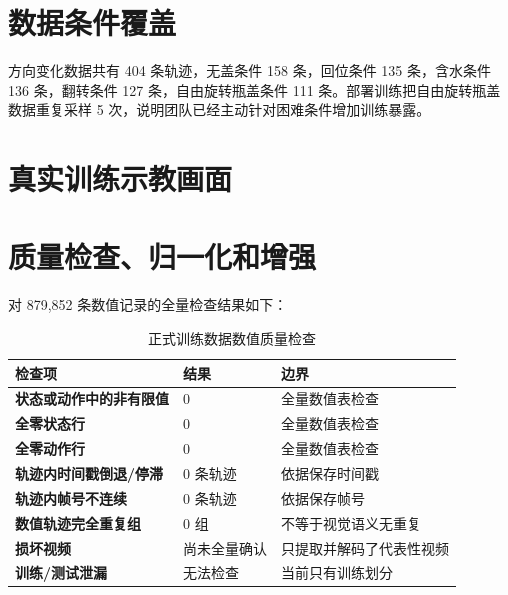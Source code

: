 \section{数据条件覆盖}


方向变化数据共有 404 条轨迹，无盖条件 158 条，回位条件 135 条，含水条件 136 条，翻转条件 127 条，自由旋转瓶盖条件 111 条。部署训练把自由旋转瓶盖数据重复采样 5 次，说明团队已经主动针对困难条件增加训练暴露。


\section{真实训练示教画面}


\section{质量检查、归一化和增强}

对 879,852 条数值记录的全量检查结果如下：

\begin{table}[H]
\centering
\caption{正式训练数据数值质量检查}
\begin{tabularx}{\textwidth}{>{\bfseries}p{42mm}p{28mm}X}
\toprule
检查项 & 结果 & 边界\\
\midrule
状态或动作中的非有限值 & 0 & 全量数值表检查\\
全零状态行 & 0 & 全量数值表检查\\
全零动作行 & 0 & 全量数值表检查\\
轨迹内时间戳倒退/停滞 & 0 条轨迹 & 依据保存时间戳\\
轨迹内帧号不连续 & 0 条轨迹 & 依据保存帧号\\
数值轨迹完全重复组 & 0 组 & 不等于视觉语义无重复\\
损坏视频 & 尚未全量确认 & 只提取并解码了代表性视频\\
训练/测试泄漏 & 无法检查 & 当前只有训练划分\\
\bottomrule
\end{tabularx}
\end{table}

